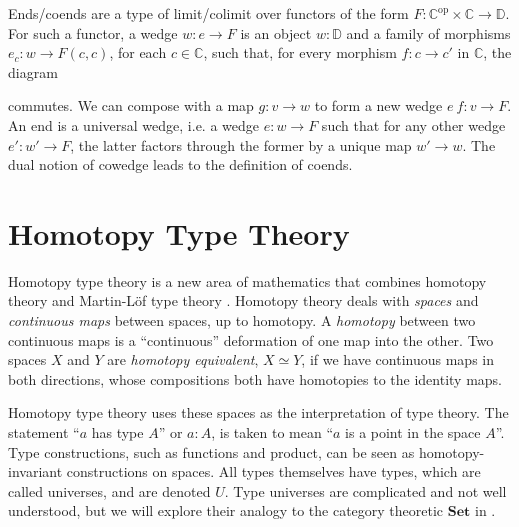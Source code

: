 \documentclass[12pt, parskip, DIV=14]{scrbook}
\begin{document}
Ends/coends are a type of limit/colimit over functors of the form $F : \mathbb{C}^\mathrm{op} \times \mathbb{C} \to \mathbb{D}$. For such a functor, a wedge $w : e \to F$ is an object $w : \mathbb{D}$ and a family of morphisms $e_c : w \to F(c,c)$, for each $c \in \mathbb{C}$, such that, for every morphism $f : c \to c'$ in $\mathbb{C}$, the diagram
\begin{center}
\end{center}
commutes. We can compose with a map $g : v \to w$ to form a new wedge $e~f : v \to F$. An end is a universal wedge, i.e. a wedge $e : w \to F$ such that for any other wedge $e' : w' \to F$, the latter factors through the former by a unique map $w' \to w$. The dual notion of cowedge leads to the definition of coends.


\section{Homotopy Type Theory}
\label{sec:HoTT}

Homotopy type theory is a new area of mathematics that combines homotopy theory and Martin-L\"of type theory \citep{martin1975intuitionistic}. Homotopy theory deals with \textit{spaces} and \textit{continuous maps} between spaces, up to homotopy. A \textit{homotopy} between two continuous maps is a ``continuous'' deformation of one map into the other. Two spaces $X$ and $Y$ are \textit{homotopy equivalent}, $X \simeq Y$, if we have continuous maps in both directions, whose compositions both have homotopies to the identity maps.

Homotopy type theory uses these spaces as the interpretation of type theory. The statement ``$a$ has type $A$'' or $a : A$, is taken to mean ``$a$ is a point in the space $A$''. Type constructions, such as functions and product, can be seen as homotopy-invariant constructions on spaces. All types themselves have types, which are called universes, and are denoted $U$. Type universes are complicated and not well understood, but we will explore their analogy to the category theoretic $\mathbf{Set}$ in .
\end{document}
